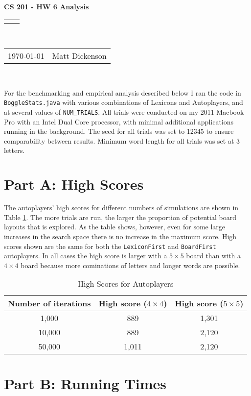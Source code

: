 \documentclass[12pt]{article}
\renewcommand{\title}[1]{\textbf{#1}\\}
\renewcommand{\line}{\begin{tabularx}{\textwidth}{X>{\raggedleft}X}\hline\\\end{tabularx}\\[-0.5cm]}
\newcommand{\leftright}[2]{\begin{tabularx}{\textwidth}{X>{\raggedleft}X}#1%
& #2\\\end{tabularx}\\[-0.5cm]}
\begin{document}
\title{CS 201 - HW 6 Analysis}
\line
\leftright{\today}{Matt Dickenson} %
\setlength{\parindent}{16pt}

For the benchmarking and empirical analysis described below I ran the code in \texttt{BoggleStats.java} with various combinations of Lexicons and Autoplayers, and at several values of \texttt{NUM\_TRIALS}. All trials were conducted on my 2011 Macbook Pro with an Intel Dual Core processor, with minimal additional applications running in the background. The seed for all trials was set to 12345 to ensure comparability between results. Minimum word length for all trials was set at 3 letters. 

\section*{Part A: High Scores}

The autoplayers' high scores for different numbers of simulations are shown in Table \ref{highscores}. The more trials are run, the larger the proportion of potential board layouts that is explored. As the table shows, however, even for some large increases in the search space there is no increase in the maximum score. High scores shown are the same for both the \texttt{LexiconFirst} and \texttt{BoardFirst} autoplayers. In all cases the high score is larger with a $5\times5$ board than with a $4 \times 4$ board because more cominations of letters and longer words are possible.

\begin{table}[ht]
\begin{center}
\caption{High Scores for Autoplayers}
\label{highscores}
\begin{tabular}{ccc}
Number of iterations & High score ($4 \times 4$) & High score ($5 \times 5$) \\
\hline
1,000 & 889 & 1,301 \\
10,000 & 889 & 2,120 \\
50,000 & 1,011 & 2,120 \\
\hline
\end{tabular}
\end{center}
\end{table}

\section*{Part B: Running Times}
\end{document}
